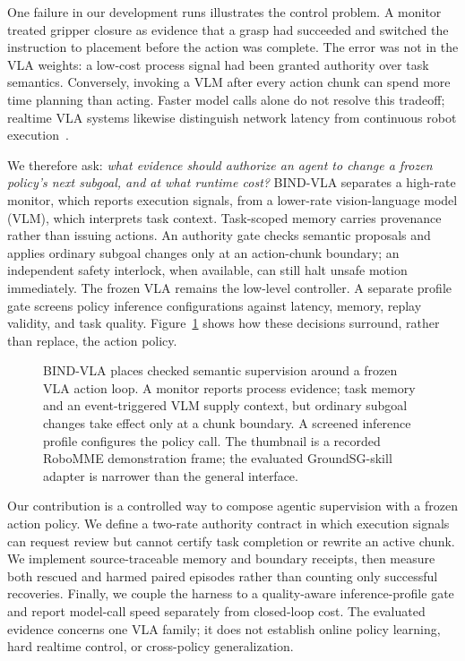 \documentclass[letterpaper,10pt,conference]{ieeeconf}
\begin{document}
One failure in our development runs illustrates the control problem. A monitor treated gripper closure as evidence that a grasp had succeeded and switched the instruction to placement before the action was complete. The error was not in the VLA weights: a low-cost process signal had been granted authority over task semantics. Conversely, invoking a VLM after every action chunk can spend more time planning than acting. Faster model calls alone do not resolve this tradeoff; realtime VLA systems likewise distinguish network latency from continuous robot execution~\cite{realtimevla}.

We therefore ask: \emph{what evidence should authorize an agent to change a frozen policy's next subgoal, and at what runtime cost?} BIND-VLA separates a high-rate monitor, which reports execution signals, from a lower-rate vision-language model (VLM), which interprets task context. Task-scoped memory carries provenance rather than issuing actions. An authority gate checks semantic proposals and applies ordinary subgoal changes only at an action-chunk boundary; an independent safety interlock, when available, can still halt unsafe motion immediately. The frozen VLA remains the low-level controller. A separate profile gate screens policy inference configurations against latency, memory, replay validity, and task quality. Figure~\ref{fig:architecture} shows how these decisions surround, rather than replace, the action policy.

\begin{figure}[t]
\centering
\resizebox{0.96\textwidth}{!}{}
\caption{BIND-VLA places checked semantic supervision around a frozen VLA action loop. A monitor reports process evidence; task memory and an event-triggered VLM supply context, but ordinary subgoal changes take effect only at a chunk boundary. A screened inference profile configures the policy call. The thumbnail is a recorded RoboMME demonstration frame; the evaluated GroundSG-skill adapter is narrower than the general interface.}
\label{fig:architecture}
\end{figure}

Our contribution is a controlled way to compose agentic supervision with a
frozen action policy. We define a two-rate authority contract in which
execution signals can request review but cannot certify task completion or
rewrite an active chunk. We implement source-traceable memory and boundary
receipts, then measure both rescued and harmed paired episodes rather than
counting only successful recoveries. Finally, we couple the harness to a
quality-aware inference-profile gate and report model-call speed separately
from closed-loop cost. The evaluated evidence concerns one VLA family; it
does not establish online policy learning, hard realtime control, or
cross-policy generalization.
\end{document}
